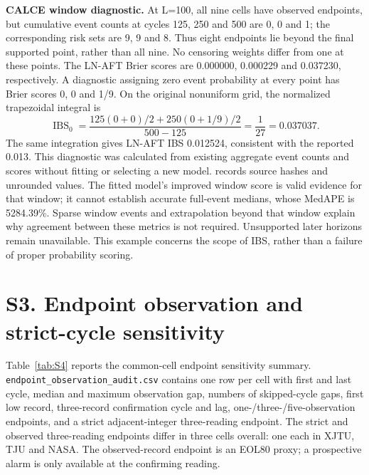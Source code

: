 \documentclass[10pt,a4paper]{article}
\begin{document}
\textbf{CALCE window diagnostic.} At L=100, all nine cells have observed endpoints, but cumulative event counts at cycles 125, 250 and 500 are 0, 0 and 1; the corresponding risk sets are 9, 9 and 8. Thus eight endpoints lie beyond the final supported point, rather than all nine. No censoring weights differ from one at these points. The LN-AFT Brier scores are 0.000000, 0.000229 and 0.037230, respectively. A diagnostic assigning zero event probability at every point has Brier scores 0, 0 and 1/9. On the original nonuniform grid, the normalized trapezoidal integral is
\[
\operatorname{IBS}_0=\frac{125(0+0)/2+250(0+1/9)/2}{500-125}=\frac{1}{27}=0.037037.
\]
The same integration gives LN-AFT IBS 0.012524, consistent with the reported 0.013. This diagnostic was calculated from existing aggregate event counts and scores without fitting or selecting a new model.  records source hashes and unrounded values. The fitted model's improved window score is valid evidence for that window; it cannot establish accurate full-event medians, whose MedAPE is 5284.39\%. Sparse window events and extrapolation beyond that window explain why agreement between these metrics is not required. Unsupported later horizons remain unavailable. This example concerns the scope of IBS, rather than a failure of proper probability scoring.

\section*{S3. Endpoint observation and strict-cycle sensitivity}
Table~\ref{tab:S4} reports the common-cell endpoint sensitivity summary.
\texttt{endpoint\_observation\_audit.csv} contains one row per cell with first and last cycle, median and maximum observation gap, numbers of skipped-cycle gaps, first low record, three-record confirmation cycle and lag, one-/three-/five-observation endpoints, and a strict adjacent-integer three-reading endpoint. The strict and observed three-reading endpoints differ in three cells overall: one each in XJTU, TJU and NASA. The observed-record endpoint is an EOL80 proxy; a prospective alarm is only available at the confirming reading.
\end{document}
